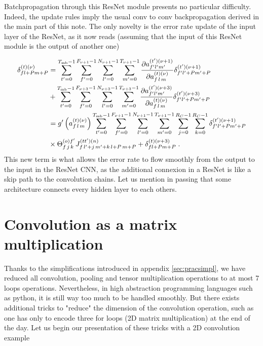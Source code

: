 \begin{subappendices}
Batchpropagation through this ResNet module presents no particular difficulty. Indeed, the update rules imply the usual conv to conv backpropagation derived in the main part of this note. The only novelty is the error rate update of the input layer of the ResNet, as it now reads (assuming that the input of this ResNet module is the output of another one)

\begin{align}
\delta^{(t)(\nu)}_{fl+Pm+P}&=
%
\sum_{t'=0}^{T_{{\rm mb}}-1}\sum^{F_{\nu+1}-1}_{f'=0}\sum^{N_{\nu+1}-1}_{l'=0}\sum^{T_{\nu+1}-1}_{m'=0}
%
\frac{\partial a_{f'l'm'}^{(t')(\nu+1)}}{\partial a_{f\,l\,m}^{(t)(\nu)}}
%
\delta_{f'l'+Pm'+P}^{(t')(\nu+1)}\notag\\
%
&+\sum_{t'=0}^{T_{{\rm mb}}-1}\sum^{F_{\nu+3}-1}_{f'=0}\sum^{N_{\nu+3}-1}_{l'=0}\sum^{T_{\nu+3}-1}_{m'=0}
%
\frac{\partial a_{f'l'm'}^{(t')(\nu+3)}}{\partial a_{f\,l\,m}^{(t)(\nu)}}
%
\delta_{f'l'+Pm'+P}^{(t')(\nu+3)}\notag\\
%
&=g'\left(a_{f\,l\,m}^{(t)(\nu)}\right)
%
\sum_{t'=0}^{T_{{\rm mb}}-1}\sum^{F_{\nu+1}-1}_{f'=0}\sum^{N_{\nu+1}-1}_{l'=0}\sum^{T_{\nu+1}-1}_{m'=0}
%
\sum^{R_C-1}_{j=0}\sum^{R_C-1}_{k=0}\delta_{f'l'+Pm'+P}^{(t')(\nu+1)}\notag\\
%
&\times \Theta^{(o)f'}_{f\,j\,k} J^{(tt')(n)}_{f\, l'+j\,m'+k\,l+P\,m+P}
%
+\delta_{fl+Pm+P}^{(t)(\nu+3)}\;.
\end{align}
This new term is what allows the error rate to flow smoothly from the output to the input in the ResNet CNN, as the additional connexion in a ResNet is like a skip path to the convolution chains. Let us mention in passing that some architecture connects every hidden layer to each others\cite{HuangGLZLW}.


\section{Convolution as a matrix multiplication}

Thanks to the simplifications introduced in appendix \ref{sec:pracsimpl}, we have reduced all convolution, pooling and tensor multiplication operations to at most 7 loops operations. Nevertheless, in high abstraction programming languages such as python, it is still way too much to be handled smoothly. But there exists additional tricks to "reduce" the dimension of the convolution operation, such as one has only to encode three for loops (2D matrix multiplication) at the end of the day. Let us begin our presentation of these tricks with a 2D convolution example


\end{subappendices}
